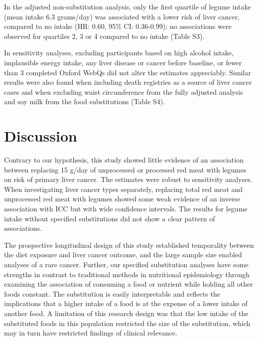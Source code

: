 \documentclass[nutrients,article,submit,moreauthors,pdftex]{Definitions/mdpi}
\begin{document}
In the adjusted non-substitution analysis, only the first quartile of
legume intake (mean intake 6.3 grams/day) was associated with a lower
risk of liver cancer, compared to no intake
(HR: 0.60, 95\% CI: 0.36-0.99);
no associations were observed for quartiles 2, 3 or 4 compared to no
intake (Table S3).

In sensitivity analyses, excluding participants based on high alcohol
intake, implausible energy intake, any liver disease or cancer before
baseline, or fewer than 3 completed Oxford WebQs did not alter the
estimates appreciably. Similar results were also found when including
death registries as a source of liver cancer cases and when excluding
waist circumference from the fully adjusted analysis and soy milk from
the food substitutions (Table S4).

\hypertarget{sec4}{%
\section{Discussion}\label{sec4}}

Contrary to our hypothesis, this study showed little evidence of an
association between replacing 15 g/day of unprocessed or processed red
meat with legumes on risk of primary liver cancer. The estimates were
robust to sensitivity analyses. When investigating liver cancer types
separately, replacing total red meat and unprocessed red meat with
legumes showed some weak evidence of an inverse association with ICC but
with wide confidence intervals. The results for legume intake without
specified substitutions did not show a clear pattern of associations.

The prospective longitudinal design of this study established
temporality between the diet exposure and liver cancer outcome, and the
large sample size enabled analyses of a rare cancer. Further, our
specified substitution analyses have some strengths in contrast to
traditional methods in nutritional epidemiology through examining the
association of consuming a food or nutrient while holding all other
foods constant. The substitution is easily interpretable and reflects
the implications that a higher intake of a food is at the expense of a
lower intake of another food. A limitation of this research design was
that the low intake of the substituted foods in this population
restricted the size of the substitution, which may in turn have
restricted findings of clinical relevance.
\end{document}
